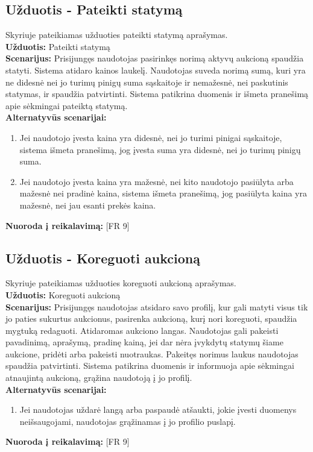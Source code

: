\documentclass{VUMIFPSkursinis}
\begin{document}
	\subsection{Užduotis - Pateikti statymą}
	Skyriuje pateikiamas užduoties pateikti statymą aprašymas.\\
	\textbf{Užduotis:}  Pateikti statymą \\
	\textbf{Scenarijus:}  Prisijungęs naudotojas pasirinkęs norimą aktyvų aukcioną spaudžia statyti. Sistema atidaro kainos laukelį. Naudotojas suveda norimą sumą, kuri yra ne didesnė nei jo turimų pinigų suma sąskaitoje ir nemažesnė, nei paskutinis statymas, ir spaudžia patvirtinti. Sistema patikrina duomenis ir išmeta pranešimą apie sėkmingai pateiktą statymą. \\
	\textbf{Alternatyvūs scenarijai:}
	\begin{enumerate}
		\item Jei naudotojo įvesta kaina yra didesnė, nei jo turimi pinigai sąskaitoje, sistema išmeta pranešimą, jog įvesta suma yra didesnė, nei jo turimų pinigų suma.
		\item Jei naudotojo įvesta kaina yra mažesnė, nei kito naudotojo pasiūlyta arba mažesnė nei pradinė kaina, sistema išmeta pranešimą, jog pasiūlyta kaina yra mažesnė, nei jau esanti prekės kaina.
	\end{enumerate}
	\textbf{Nuoroda į reikalavimą: } [FR 9]

	\subsection{Užduotis - Koreguoti aukcioną}
	Skyriuje pateikiamas užduoties koreguoti aukcioną aprašymas.\\
	\textbf{Užduotis:}  Koreguoti aukcioną \\
	\textbf{Scenarijus:}  Prisijungęs naudotojas atsidaro savo profilį, kur gali matyti visus tik jo paties sukurtus aukcionus, pasirenka aukcioną, kurį nori koreguoti, spaudžia mygtuką redaguoti. Atidaromas aukciono langas. Naudotojas gali pakeisti pavadinimą, aprašymą, pradinę kainą, jei dar nėra įvykdytų statymų šiame aukcione, pridėti arba pakeisti nuotraukas. Pakeitęs norimus laukus naudotojas spaudžia patvirtinti. Sistema patikrina duomenis ir informuoja apie sėkmingai atnaujintą aukcioną, grąžina naudotoją į jo profilį.  \\
	\textbf{Alternatyvūs scenarijai:}
	\begin{enumerate}
		\item Jei naudotojas uždarė langą arba paspaudė atšaukti, jokie įvesti duomenys neišsaugojami, naudotojas grąžinamas į jo profilio puslapį.
	\end{enumerate}
	\textbf{Nuoroda į reikalavimą: } [FR 9]
\end{document}
